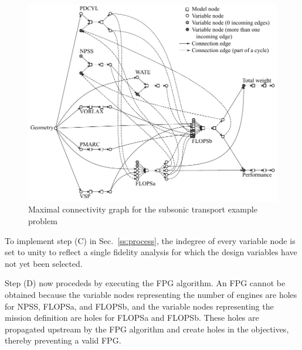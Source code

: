 	\begin{figure}[htb!]
	  \begin{center}
		\includegraphics[width=6in]{images/MCG_edit_holes}
	  \end{center}
	  \caption{Maximal connectivity graph for the subsonic transport example problem}
	\label{f:MCG holes}
	\end{figure}

To implement step (C) in Sec.~\ref{ss:process}, the indegree of every variable node is set to unity to reflect a single fidelity analysis for which the design variables have not yet been selected.

Step (D) now procededs by executing the FPG algorithm. 
An FPG cannot be obtained because the variable nodes representing the number of engines are holes for NPSS, FLOPSa, and FLOPSb, and the variable nodes representing the mission definition are holes for FLOPSa and FLOPSb. 
These holes are propagated upstream by the FPG algorithm and create holes in the objectives, thereby preventing a valid FPG.

